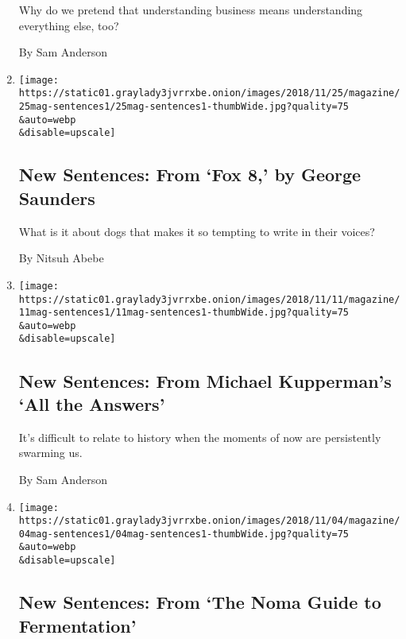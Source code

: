 \begin{enumerate}
  Why do we pretend that understanding business means understanding
  everything else, too?

  By Sam Anderson
\item
  \href{/2018/11/21/magazine/new-sentences-from-fox-8-by-george-saunders.html}{}

  \texttt{[image: https://static01.graylady3jvrrxbe.onion/images/2018/11/25/magazine/25mag-sentences1/25mag-sentences1-thumbWide.jpg?quality=75\\\&auto=webp\\\&disable=upscale]}

  \hypertarget{new-sentences-from-fox-8-by-george-saunders}{%
  \subsection{New Sentences: From `Fox 8,' by George
  Saunders}\label{new-sentences-from-fox-8-by-george-saunders}}

  What is it about dogs that makes it so tempting to write in their
  voices?

  By Nitsuh Abebe
\item
  \href{/2018/11/09/magazine/new-sentences-from-michael-kuppermans-all-the-answers.html}{}

  \texttt{[image: https://static01.graylady3jvrrxbe.onion/images/2018/11/11/magazine/11mag-sentences1/11mag-sentences1-thumbWide.jpg?quality=75\\\&auto=webp\\\&disable=upscale]}

  \hypertarget{new-sentences-from-michael-kuppermans-all-the-answers}{%
  \subsection{New Sentences: From Michael Kupperman's `All the
  Answers'}\label{new-sentences-from-michael-kuppermans-all-the-answers}}

  It's difficult to relate to history when the moments of now are
  persistently swarming us.

  By Sam Anderson
\item
  \href{/2018/11/01/magazine/new-sentences-from-the-noma-guide-to-fermentation.html}{}

  \texttt{[image: https://static01.graylady3jvrrxbe.onion/images/2018/11/04/magazine/04mag-sentences1/04mag-sentences1-thumbWide.jpg?quality=75\\\&auto=webp\\\&disable=upscale]}

  \hypertarget{new-sentences-from-the-noma-guide-to-fermentation}{%
  \subsection{New Sentences: From `The Noma Guide to
  Fermentation'}\label{new-sentences-from-the-noma-guide-to-fermentation}}


\end{enumerate}
